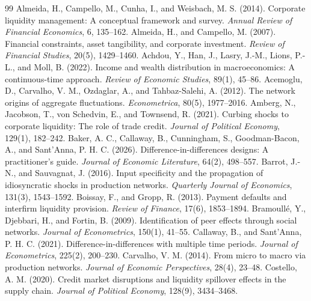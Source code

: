 \documentclass[11pt,a4paper]{article}
\begin{document}
\begin{thebibliography}{99}
 Almeida, H., Campello, M., Cunha, I., and Weisbach, M. S. (2014). Corporate liquidity management: A conceptual framework and survey. \emph{Annual Review of Financial Economics}, 6, 135--162.
 Almeida, H., and Campello, M. (2007). Financial constraints, asset tangibility, and corporate investment. \emph{Review of Financial Studies}, 20(5), 1429--1460.
 Achdou, Y., Han, J., Lasry, J.-M., Lions, P.-L., and Moll, B. (2022). Income and wealth distribution in macroeconomics: A continuous-time approach. \emph{Review of Economic Studies}, 89(1), 45--86.
 Acemoglu, D., Carvalho, V. M., Ozdaglar, A., and Tahbaz-Salehi, A. (2012). The network origins of aggregate fluctuations. \emph{Econometrica}, 80(5), 1977--2016.
 Amberg, N., Jacobson, T., von Schedvin, E., and Townsend, R. (2021). Curbing shocks to corporate liquidity: The role of trade credit. \emph{Journal of Political Economy}, 129(1), 182--242.
 Baker, A. C., Callaway, B., Cunningham, S., Goodman-Bacon, A., and Sant’Anna, P. H. C. (2026). Difference-in-differences designs: A practitioner’s guide. \emph{Journal of Economic Literature}, 64(2), 498--557.
 Barrot, J.-N., and Sauvagnat, J. (2016). Input specificity and the propagation of idiosyncratic shocks in production networks. \emph{Quarterly Journal of Economics}, 131(3), 1543--1592.
 Boissay, F., and Gropp, R. (2013). Payment defaults and interfirm liquidity provision. \emph{Review of Finance}, 17(6), 1853--1894.
 Bramoullé, Y., Djebbari, H., and Fortin, B. (2009). Identification of peer effects through social networks. \emph{Journal of Econometrics}, 150(1), 41--55.
 Callaway, B., and Sant’Anna, P. H. C. (2021). Difference-in-differences with multiple time periods. \emph{Journal of Econometrics}, 225(2), 200--230.
 Carvalho, V. M. (2014). From micro to macro via production networks. \emph{Journal of Economic Perspectives}, 28(4), 23--48.
 Costello, A. M. (2020). Credit market disruptions and liquidity spillover effects in the supply chain. \emph{Journal of Political Economy}, 128(9), 3434--3468.

\end{thebibliography}
\end{document}
